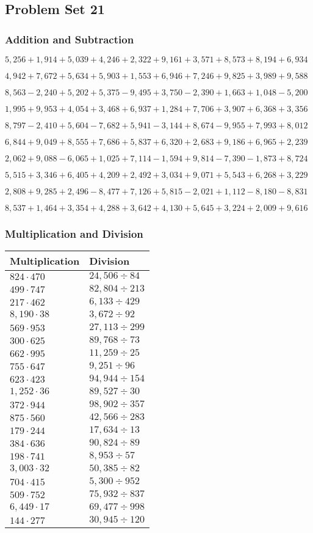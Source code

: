\hypertarget{problem-set-21-3}{%
\subsection{Problem Set 21}\label{problem-set-21-3}}

\hypertarget{addition-and-subtraction-183}{%
\subsubsection{Addition and
Subtraction}\label{addition-and-subtraction-183}}

\(5,256+1,914+5,039+4,246+2,322+9,161+3,571+8,573+8,194+ 6,934\)

\(4,942+7,672+5,634+5,903+1,553+6,946+7,246+9,825+3,989+9,588\)

\(8,563-2,240+5,202+5,375-9,495+3,750-2,390+1,663+1,048-5,200\)

\(1,995+9,953+4,054+3,468+6,937+1,284+7,706+3,907+6,368+3,356\)

\(8,797-2,410+5,604-7,682+5,941-3,144+8,674-9,955+7,993+8,012\)

\(6,844+9,049+8,555+7,686+5,837+6,320+2,683+9,186+6,965+2,239\)

\(2,062+9,088-6,065+1,025+7,114-1,594+9,814-7,390-1,873+8,724\)

\(5,515+3,346+6,405+4,209+2,492+3,034+9,071+5,543+6,268+3,229\)

\(2,808+9,285+2,496-8,477+7,126+5,815-2,021+1,112-8,180-8,831\)

\(8,537+1,464+3,354+4,288+3,642+4,130+5,645+3,224+2,009+9,616\)

\hypertarget{multiplication-and-division-182}{%
\subsubsection{Multiplication and
Division}\label{multiplication-and-division-182}}

\begin{longtable}[]{@{}ll@{}}
\toprule
Multiplication & Division\tabularnewline
\midrule
\endhead
\(824\cdot470\) & \(24,506÷84\)\tabularnewline
\(499\cdot747\) & \(82,804÷213\)\tabularnewline
\(217\cdot462\) & \(6,133÷429\)\tabularnewline
\(8,190\cdot38\) & \(3,672÷92\)\tabularnewline
\(569\cdot953\) & \(27,113÷299\)\tabularnewline
\(300\cdot625\) & \(89,768÷73\)\tabularnewline
\(662\cdot995\) & \(11,259÷25\)\tabularnewline
\(755\cdot647\) & \(9,251÷96\)\tabularnewline
\(623\cdot423\) & \(94,944÷154\)\tabularnewline
\(1,252\cdot36\) & \(89,527÷30\)\tabularnewline
\(372\cdot944\) & \(98,902÷357\)\tabularnewline
\(875\cdot560\) & \(42,566÷283\)\tabularnewline
\(179\cdot244\) & \(17,634÷13\)\tabularnewline
\(384\cdot636\) & \(90,824÷89\)\tabularnewline
\(198\cdot741\) & \(8,953÷57\)\tabularnewline
\(3,003\cdot32\) & \(50,385÷82\)\tabularnewline
\(704\cdot415\) & \(5,300÷952\)\tabularnewline
\(509\cdot752\) & \(75,932÷837\)\tabularnewline
\(6,449\cdot17\) & \(69,477÷998\)\tabularnewline
\(144\cdot277\) & \(30,945÷120\)\tabularnewline
\bottomrule
\end{longtable}

